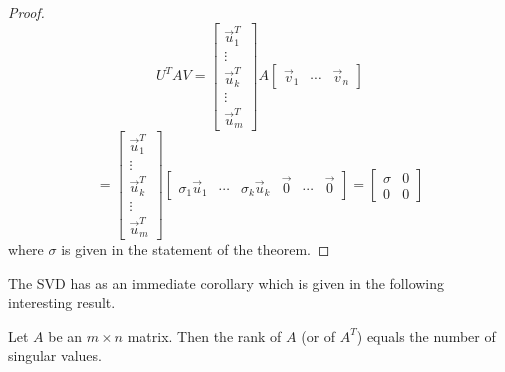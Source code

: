 \documentclass{ximera}
\begin{document}
\begin{proof}
\begin{equation*}
U^TAV=\left[
\begin{array}{c}
\vec{u}_{1}^T \\
\vdots \\
\vec{u}_{k}^T \\
\vdots \\
\vec{u}_{m}^T
\end{array}
\right] A  \left[ \begin{array}{ccc} \vec{v}_{1} & \cdots & \vec{v}_{n}\end{array}\right]
\end{equation*}
\begin{equation*}
=\left[
\begin{array}{c}
\vec{u}_{1}^T \\
\vdots \\
\vec{u}_{k}^T \\
\vdots \\
\vec{u}_{m}^T
\end{array}
\right] \left[
\begin{array}{cccccc}
\sigma _{1}\vec{u}_{1} & \cdots & \sigma _{k}\vec{u}_{k} & \vec{0}
& \cdots & \vec{0}
\end{array}
\right] =\left[
\begin{array}{cc}
\sigma & 0 \\
0 & 0
\end{array}
\right]
\end{equation*}
where $\sigma $ is given in the statement of the theorem.
\end{proof}
 
The SVD has as an immediate corollary which is given in the following interesting result.
 
\begin{corollary}\label{cor:ranksingularvalues}
Let $A$ be an $m\times n$ matrix. Then the rank of $A$ (or of $A^T$) equals
the number of singular values.
\end{corollary}
 
\end{document}

